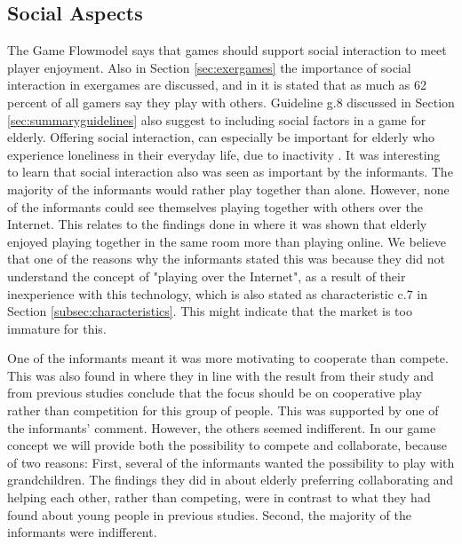 \subsection{Social Aspects}
The Game Flowmodel says that games should support social interaction to meet player enjoyment. Also in Section \ref{sec:exergames} the importance of social interaction in exergames are discussed, and  in \cite{statistics2012} it is stated that as much as 62 percent of all gamers say they play with others. Guideline g.8 discussed in Section \ref{sec:summaryguidelines} also suggest to including social factors in a game for elderly. Offering social interaction, can especially be important for elderly who experience loneliness in their everyday life, due to inactivity \cite{exergamesforelderly}. It was interesting to learn that social interaction also was seen as important by the informants. The majority of the informants would rather play together than alone. However, none of the informants could see themselves playing together with others over the Internet. This relates to the findings done in \cite{Gajadhar} where it was shown that elderly enjoyed playing together in the same room more than playing online. We believe that one of the reasons why the informants stated this was because they did not understand the concept of "playing over the Internet", as a result of their inexperience with this technology, which is also stated as characteristic c.7 in Section \ref{subsec:characteristics}. This might indicate that the market is too immature for this. 

One of the informants meant it was more motivating to cooperate than compete. This was also found in \cite{Gajadhar} where they in line with the result from their study and from previous studies conclude that the focus should be on cooperative play rather than competition for this group of people. This was supported by one of the informants' comment. However, the others seemed indifferent. In our game concept we will provide both the possibility to compete and collaborate, because of two reasons: First, several of the informants wanted the possibility to play with grandchildren. The findings they did in \cite{Gajadhar} about elderly preferring collaborating and helping each other, rather than competing, were in contrast to what they had found about young people in previous studies. Second, the majority of the informants were indifferent. 
 

